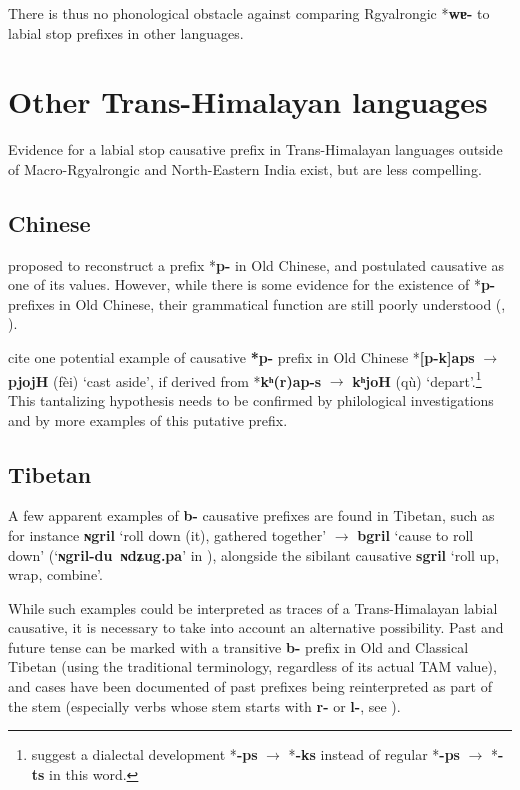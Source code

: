 \documentclass[oneside,a4paper,11pt]{article}
\newcommand{\ipa}[1]{\textbf{{\phon\mbox{#1}}}} %
\newcommand{\zh}[1]{{\cn{#1}}}
\newcommand{\forme}[2]{\ipa{#1} `#2'}
\begin{document}
There is thus no phonological obstacle against comparing Rgyalrongic *\ipa{wɐ-} to labial stop prefixes in other languages.

 \section{Other Trans-Himalayan languages} 
Evidence for a labial stop causative  prefix in Trans-Himalayan languages outside of Macro-Rgyalrongic and North-Eastern India exist, but are less compelling.

\subsection{Chinese}
 \citet[593]{maspero52} proposed to reconstruct a prefix *\ipa{p-} in Old Chinese, and postulated causative as one of its values. However,  while there is some evidence for the existence of *\ipa{p-} prefixes in Old Chinese, their grammatical function are still poorly understood (\citealt[87-9]{sagart99roc}, \citealt{behr10ocp}).
 
 \citet[154]{bs14oc} cite one potential example of causative \ipa{*p-} prefix in Old Chinese \zh{廢} *\ipa{[p-k]aps} $\rightarrow$ \ipa{pjojH} (fèi) `cast aside', if derived from \zh{去} *\ipa{kʰ(r)ap-s} $\rightarrow$ \ipa{kʰjoH} (qù) `depart'.\footnote{ \citet[153]{bs14oc} suggest a dialectal development *\ipa{-ps} $\rightarrow$ *\ipa{-ks} instead of regular *\ipa{-ps} $\rightarrow$ *\ipa{-ts} in this word. } This tantalizing hypothesis needs to be confirmed by philological investigations and by more examples of this putative prefix.
  
\subsection{Tibetan}
A few apparent examples of \ipa{b-} causative prefixes are found in Tibetan, such as for instance \forme{ɴgril}{roll down (it), gathered together} $\rightarrow$ \forme{bgril}{cause to roll down} (`\ipa{ɴgril-du ɴdʑug.pa}' in \citealt{bodrgya}), alongside the sibilant causative \forme{sgril}{roll up, wrap, combine}.

While such examples could be interpreted as traces of a Trans-Himalayan labial causative, it is necessary to take into account an alternative possibility. Past and future tense can be marked with a transitive \ipa{b-} prefix in Old and Classical Tibetan (using the traditional terminology, regardless of its actual TAM value), and cases have been documented of past prefixes being reinterpreted as part of the stem (especially verbs whose stem starts with \ipa{r-} or \ipa{l-}, see  \citet{hill05vbri, jacques10ndr, hill15lan}).
\end{document}
